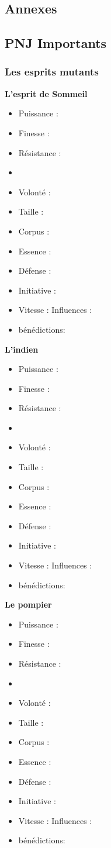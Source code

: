 \documentclass[oneside,12pt]{book}
\begin{document}
\begin{flushleft}
\chapter{Annexes}
\section{PNJ Importants}
\subsection{Les esprits mutants}
\label{esprit_mutant}
\textbf{L'esprit de Sommeil}
\begin{itemize}
\item Puissance :
\item Finesse :
\item Résistance :
\item 
\item Volonté :
\item Taille :
\item Corpus :
\item Essence :
\item Défense :
\item Initiative :
\item Vitesse :
\iiem Influences : 
\item bénédictions:
\end{itemize}

\textbf{L'indien}
\begin{itemize}
\item Puissance :
\item Finesse :
\item Résistance :
\item 
\item Volonté :
\item Taille :
\item Corpus :
\item Essence :
\item Défense :
\item Initiative :
\item Vitesse :
\iiem Influences : 
\item bénédictions:
\end{itemize}



\textbf{Le pompier}
\begin{itemize}
\item Puissance :
\item Finesse :
\item Résistance :
\item 
\item Volonté :
\item Taille :
\item Corpus :
\item Essence :
\item Défense :
\item Initiative :
\item Vitesse :
\iiem Influences : 
\item bénédictions:
\end{itemize}


\end{flushleft}
\end{document}
